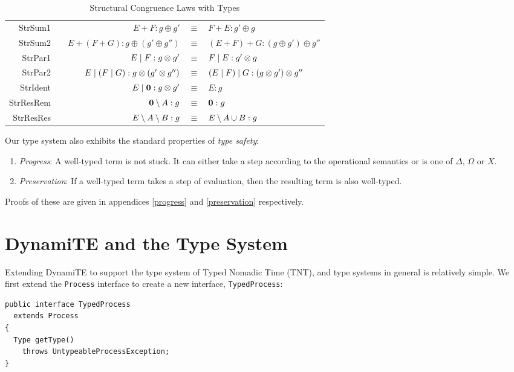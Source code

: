 \begin{table}
 \caption{Structural Congruence Laws with Types}
 \label{tab:typedstructcong}
  \shrule \centering
  \begin{tabular}{rcrcl}
  StrSum1 & \quad\quad &  
  $E + F : g \oplus g'$              & $\equiv$ & $F + E : g' \oplus g$
\\
  StrSum2 &&  
  $E + (F + G) : g \oplus (g' \oplus g'')$        & $\equiv$ & $(E + F) + G : (g \oplus g') \oplus g''$
\\
  StrPar1 &&  
  $E \;|\; F : g \otimes g'$            & $\equiv$ & $F \;|\; E : g' \otimes g$
\\
  StrPar2 &&  
  $E \;|\; (F \;|\; G) : g \otimes (g' \otimes g'')$    & $\equiv$ & $(E \;|\; F) \;|\; G : (g \otimes g') \otimes g''$
\\
  StrIdent &&  
  $E \;|\; \textbf{0} : g \otimes g'$         & $\equiv$ & $E : g$
\\
  StrResRem &&  
  $\textbf{0} \setminus {A} : g$       & $\equiv$ & $\textbf{0} : g$
\\
  StrResRes &&  
  $E \setminus {A} \setminus {B} : g$  & $\equiv$ & $E \setminus {A \cup B} : g$
  \end{tabular}
  \shrule
\end{table}

Our type system also exhibits the standard properties of \emph{type safety}:

\begin{enumerate}
\item \emph{Progress}: A well-typed term is not stuck.  It can either
  take a step according to the operational semantics or is one of
  $\Delta$, $\Omega$ or $X$.
\item \emph{Preservation}: If a well-typed term takes a step of
  evaluation, then the resulting term is also well-typed.
\end{enumerate}

\noindent Proofs of these are given in appendices \ref{progress} and
\ref{preservation} respectively.

\section{DynamiTE and the Type System}
\label{dyn:type}

Extending DynamiTE to support the type system of Typed Nomadic Time
(TNT), and type systems in general is relatively simple.  We first
extend the \texttt{Process} interface to create a new interface,
\texttt{TypedProcess}:

\begin{verbatim}
public interface TypedProcess
  extends Process
{
  Type getType()
    throws UntypeableProcessException;
}
\end{verbatim}

